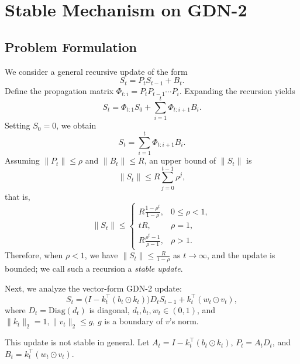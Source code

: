 \section{Stable Mechanism on GDN-2}
\label{appendix:stable_gdn2}

\subsection{Problem Formulation}

We consider a general recursive update of the form
\begin{equation}
S_t = P_t S_{t-1} + B_t.
\end{equation}
Define the propagation matrix $\Phi_{t:i} = P_t P_{t-1}\cdots P_i$. Expanding the recursion yields
\begin{equation}
S_t = \Phi_{t:1} S_0 + \sum_{i=1}^{t} \Phi_{t:i+1} B_i.
\end{equation}
Setting $S_0=0$, we obtain
\begin{equation}
S_t = \sum_{i=1}^{t} \Phi_{t:i+1} B_i.
\end{equation}
Assuming $\lVert P_t\rVert \le \rho$ and $\lVert B_t\rVert \le R$, an upper bound of $\lVert S_t\rVert$ is
\begin{equation}
\lVert S_t\rVert \le R\sum_{j=0}^{t-1} \rho^j,
\end{equation}
that is,
\begin{equation}
\lVert S_t\rVert
\le
\begin{cases}
\displaystyle R\frac{1-\rho^t}{1-\rho}, & 0\le \rho<1,\\[0.8em]
\displaystyle tR, & \rho=1,\\[0.6em]
\displaystyle R\frac{\rho^t-1}{\rho-1}, & \rho>1.
\end{cases}
\end{equation}
Therefore, when $\rho<1$, we have
$\lVert S_t\rVert \le \frac{R}{1-\rho}$ as $t\to\infty$, and the update is bounded; we call such a recursion a \emph{stable update}.

Next, we analyze the vector-form GDN-2 update:
\begin{equation}
S_t = \bigl(I - k_t^\top (b_t \odot k_t)\bigr) D_t S_{t-1} + k_t^\top (w_t \odot v_t),
\end{equation}
where $D_t=\mathrm{Diag}(d_t)$ is diagonal, $d_t,b_t,w_t\in(0,1)$, and $\lVert k_t\rVert_2=1,\lVert v_t\rVert_2\leq g$, $g$ is a boundary of $v$'s norm.

This update is not stable in general. Let
$A_t = I - k_t^\top (b_t \odot k_t)$, $P_t=A_t D_t$, and $B_t=k_t^\top (w_t \odot v_t)$.

